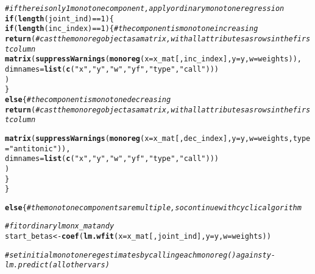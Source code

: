 \documentclass[10pt]{olplainarticle}\usepackage[]{graphicx}\usepackage[]{color}
\makeatletter
\newcommand{\hlnum}[1]{\textcolor[rgb]{0.686,0.059,0.569}{#1}}%
\newcommand{\hlstr}[1]{\textcolor[rgb]{0.192,0.494,0.8}{#1}}%
\newcommand{\hlcom}[1]{\textcolor[rgb]{0.678,0.584,0.686}{\textit{#1}}}%
\newcommand{\hlopt}[1]{\textcolor[rgb]{0,0,0}{#1}}%
\newcommand{\hlstd}[1]{\textcolor[rgb]{0.345,0.345,0.345}{#1}}%
\newcommand{\hlkwa}[1]{\textcolor[rgb]{0.161,0.373,0.58}{\textbf{#1}}}%
\newcommand{\hlkwb}[1]{\textcolor[rgb]{0.69,0.353,0.396}{#1}}%
\newcommand{\hlkwc}[1]{\textcolor[rgb]{0.333,0.667,0.333}{#1}}%
\newcommand{\hlkwd}[1]{\textcolor[rgb]{0.737,0.353,0.396}{\textbf{#1}}}%
\newenvironment{kframe}{%
 \def\at@end@of@kframe{}%
 \ifinner\ifhmode%
  \def\at@end@of@kframe{\end{minipage}}%
  \begin{minipage}{\columnwidth}%
 \fi\fi%
 \def\FrameCommand##1{\hskip\@totalleftmargin \hskip-\fboxsep
 \colorbox{shadecolor}{##1}\hskip-\fboxsep
     \hskip-\linewidth \hskip-\@totalleftmargin \hskip\columnwidth}%
 \MakeFramed {\advance\hsize-\width
   \@totalleftmargin\z@ \linewidth\hsize
   \@setminipage}}%
 {\par\unskip\endMakeFramed%
 \at@end@of@kframe}
\newenvironment{knitrout}{}{} %
\makeatother
\begin{document}
\begin{appendices}
\begin{knitrout}
\begin{kframe}
\begin{alltt}
  \hlcom{# if there is only 1 monotone component, apply ordinary monotone regression}
  \hlkwa{if}\hlstd{(}\hlkwd{length}\hlstd{(joint_ind)} \hlopt{==} \hlnum{1}\hlstd{)\{}
    \hlkwa{if}\hlstd{(}\hlkwd{length}\hlstd{(inc_index)} \hlopt{==} \hlnum{1}\hlstd{)\{} \hlcom{# the component is monotone increasing}
      \hlkwd{return}\hlstd{(} \hlcom{# cast the monoreg object as a matrix, with all attributes as rows in the first column}
        \hlkwd{matrix}\hlstd{(}\hlkwd{suppressWarnings}\hlstd{(}\hlkwd{monoreg}\hlstd{(}\hlkwc{x} \hlstd{= x_mat[,inc_index],} \hlkwc{y} \hlstd{= y,} \hlkwc{w} \hlstd{= weights)),}
               \hlkwc{dimnames} \hlstd{=} \hlkwd{list}\hlstd{(}\hlkwd{c}\hlstd{(}\hlstr{"x"}\hlstd{,} \hlstr{"y"}\hlstd{,} \hlstr{"w"}\hlstd{,} \hlstr{"yf"}\hlstd{,} \hlstr{"type"}\hlstd{,} \hlstr{"call"}\hlstd{)))}
      \hlstd{)}
    \hlstd{\}}
    \hlkwa{else}\hlstd{\{} \hlcom{# the component is monotone decreasing}
      \hlkwd{return}\hlstd{(} \hlcom{# cast the monoreg object as a matrix, with all attributes as rows in the first column}

        \hlkwd{matrix}\hlstd{(}\hlkwd{suppressWarnings}\hlstd{(}\hlkwd{monoreg}\hlstd{(}\hlkwc{x} \hlstd{= x_mat[,dec_index],} \hlkwc{y} \hlstd{= y,} \hlkwc{w} \hlstd{= weights,} \hlkwc{type} \hlstd{=} \hlstr{"antitonic"}\hlstd{)),}
               \hlkwc{dimnames} \hlstd{=} \hlkwd{list}\hlstd{(}\hlkwd{c}\hlstd{(}\hlstr{"x"}\hlstd{,} \hlstr{"y"}\hlstd{,} \hlstr{"w"}\hlstd{,} \hlstr{"yf"}\hlstd{,} \hlstr{"type"}\hlstd{,} \hlstr{"call"}\hlstd{)))}
      \hlstd{)}
    \hlstd{\}}
  \hlstd{\}}

  \hlkwa{else}\hlstd{\{} \hlcom{# the monotone components are multiple, so continue with cyclic algorithm}

    \hlcom{# fit ordinary lm on x_mat and y}
    \hlstd{start_betas} \hlkwb{<-} \hlkwd{coef}\hlstd{(}\hlkwd{lm.wfit}\hlstd{(}\hlkwc{x}\hlstd{=x_mat[,joint_ind],} \hlkwc{y}\hlstd{=y,} \hlkwc{w}\hlstd{=weights))}

    \hlcom{# set initial monotone reg estimates by calling each monoreg() against y - lm.predict(all other vars)}


\end{alltt}
\end{kframe}
\end{knitrout}
\end{appendices}
\end{document}
